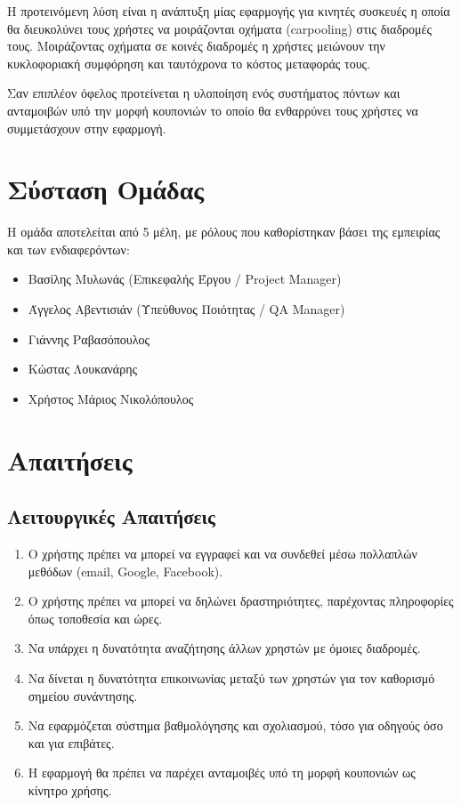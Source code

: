 Η προτεινόμενη λύση είναι η ανάπτυξη μίας εφαρμογής για κινητές συσκευές
η οποία θα διευκολύνει τους χρήστες να μοιράζονται οχήματα (carpooling) στις
διαδρομές τους. Μοιράζοντας οχήματα σε κοινές διαδρομές η χρήστες μειώνουν
την κυκλοφοριακή συμφόρηση και ταυτόχρονα το κόστος μεταφοράς τους.

Σαν επιπλέον όφελος προτείνεται η υλοποίηση ενός συστήματος πόντων και ανταμοιβών
υπό την μορφή κουπονιών το οποίο θα ενθαρρύνει τους χρήστες να συμμετάσχουν
στην εφαρμογή.

\newpage

\section{Σύσταση Ομάδας}
Η ομάδα αποτελείται από 5 μέλη, με ρόλους που καθορίστηκαν βάσει της εμπειρίας και των ενδιαφερόντων:
\begin{itemize}
    \item Βασίλης Μυλωνάς (Επικεφαλής Έργου / Project Manager)
    \item Άγγελος Αβεντισιάν (Υπεύθυνος Ποιότητας / QA Manager)
    \item Γιάννης Ραβασόπουλος
    \item Κώστας Λουκανάρης
    \item Χρήστος Μάριος Νικολόπουλος
\end{itemize}

\newpage

\section{Απαιτήσεις}

\subsection{Λειτουργικές Απαιτήσεις}

\begin{enumerate}
    \item Ο χρήστης πρέπει να μπορεί να εγγραφεί και να συνδεθεί μέσω πολλαπλών μεθόδων (email, Google, Facebook).
    \item Ο χρήστης πρέπει να μπορεί να δηλώνει δραστηριότητες, παρέχοντας πληροφορίες όπως τοποθεσία και ώρες.
    \item Να υπάρχει η δυνατότητα αναζήτησης άλλων χρηστών με όμοιες διαδρομές.
    \item Να δίνεται η δυνατότητα επικοινωνίας μεταξύ των χρηστών για τον καθορισμό σημείου συνάντησης.
    \item Να εφαρμόζεται σύστημα βαθμολόγησης και σχολιασμού, τόσο για οδηγούς όσο και για επιβάτες.
    \item Η εφαρμογή θα πρέπει να παρέχει ανταμοιβές υπό τη μορφή κουπονιών ως κίνητρο χρήσης.
\end{enumerate}

